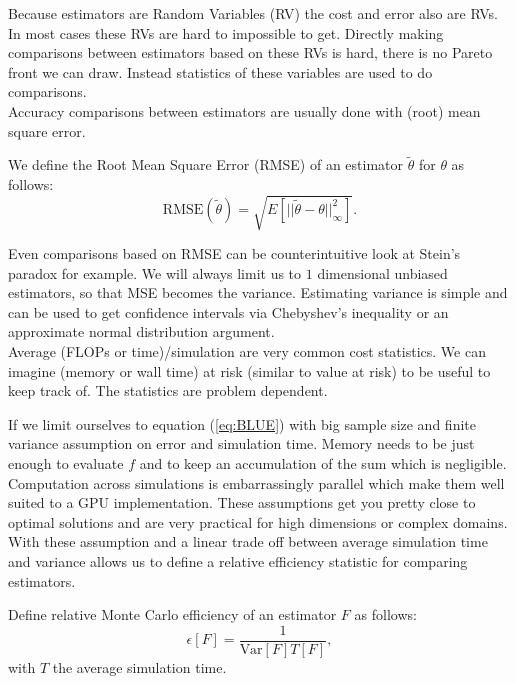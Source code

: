 \documentclass[a4paper,12pt]{article}
\begin{document}
Because estimators are Random Variables (RV)
the cost and error also are RVs. In most cases
these RVs are hard to impossible to get.
Directly making comparisons between estimators based on these
RVs is hard, there is no Pareto front we can draw.
Instead statistics of these variables are used
to do comparisons.\\

Accuracy comparisons between estimators
are usually done with (root) mean square error.
\begin{definition}
    We define the Root Mean Square Error (RMSE) of an estimator $\tilde{\theta}$ for $\theta$  as follows:
    \begin{equation} \label{eq:BLUE}
        \text{RMSE}(\tilde{\theta}) = \sqrt{E[||\tilde{\theta}-\theta||^{2}_{\infty}]}.
    \end{equation}
\end{definition}

Even comparisons based on RMSE can be counterintuitive look at
Stein's paradox for example. We will always
limit us to $1$ dimensional unbiased estimators,
so that MSE becomes the variance.
Estimating variance is simple and can be used to
get confidence intervals via Chebyshev's inequality or
an approximate normal distribution argument.  \\

Average (FLOPs or time)/simulation are very common cost statistics.
We can imagine (memory or wall time) at risk (similar to value at risk) to be useful
to keep track of. The statistics are problem dependent.

If we limit ourselves to equation (\ref{eq:BLUE}) with big sample size and
finite variance assumption on error and simulation time.
Memory needs to be just enough to evaluate $f$ and to keep an accumulation
of the sum which is negligible.
Computation across simulations is embarrassingly parallel which
make them well suited to a GPU implementation. These assumptions get you
pretty close to optimal solutions and are very practical for high dimensions
or complex domains. With these assumption and a linear trade off between average simulation
time and variance allows us to define a relative efficiency statistic
for comparing estimators.

\begin{definition}
    Define relative Monte Carlo efficiency of an
    estimator $F$ as follows:
    \begin{equation}
        \epsilon[F]=\frac{1}{\text{Var}[F] T[F]},
    \end{equation}
    with $T$ the average simulation time.
\end{definition}
\end{document}
